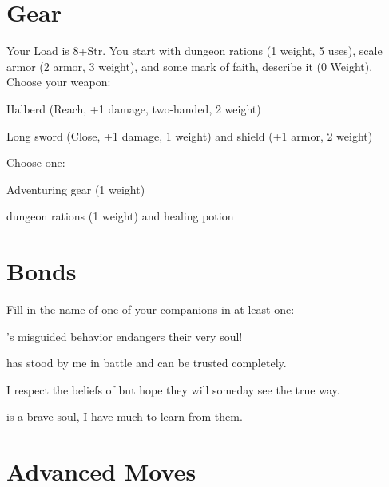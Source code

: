  
\section{Gear}   
 



Your Load is 8+Str. You start with dungeon rations (1 weight, 5 uses), scale armor (2 armor, 3 weight), and some mark of faith, describe it (0 Weight). Choose your weapon:

 
\startitemize[1,packed]

\item Halberd (Reach, +1 damage, two-handed, 2 weight)

 
\item Long sword (Close, +1 damage, 1 weight) and shield (+1 armor, 2 weight)


\stopitemize
 

Choose one:

 
\startitemize[1,packed]

\item Adventuring gear (1 weight)

 
\item dungeon rations (1 weight) and healing potion


\stopitemize


 
\section{Bonds}   
 



Fill in the name of one of your companions in at least one:

 

\thinrules[2]'s misguided behavior endangers their very soul!

 

\thinrules[2] has stood by me in battle and can be trusted completely.

 

I respect the beliefs of \thinrules[2] but hope they will someday see the true way.

 

\thinrules[2] is a brave soul, I have much to learn from them.



 
\section{Advanced Moves}    
 


